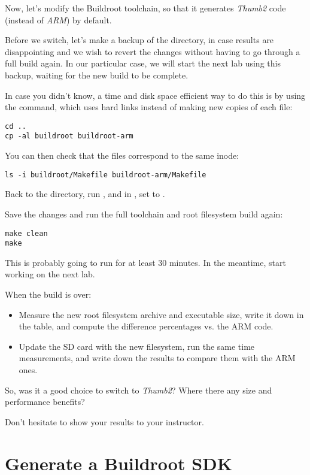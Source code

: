 Now, let's modify the Buildroot toolchain, so that it generates {\em
Thumb2} code (instead of {\em ARM}) by default.

Before we switch, let's make a backup of the  directory,
in case results are disappointing and we wish to revert the changes without
having to go through a full build again. In our particular case, we will
start the next lab using this backup, waiting for the new build to be
complete.

In case you didn't know, a time and disk space efficient way to do this is by using the
 command, which uses hard links instead of making new copies
of each file:

\begin{verbatim}
cd ..
cp -al buildroot buildroot-arm
\end{verbatim}

You can then check that the files correspond to the same inode:
\begin{verbatim}
ls -i buildroot/Makefile buildroot-arm/Makefile
\end{verbatim}

Back to the  directory, run , and
in , set  to
.

Save the changes and run the full toolchain and root filesystem build
again:

\begin{verbatim}
make clean
make
\end{verbatim}

This is probably going to run for at least 30 minutes. In the meantime,
start working on the next lab.

When the build is over:
\begin{itemize}
\item Measure the new root filesystem archive and 
executable size, write it down in the table, and compute the difference
percentages vs. the ARM code.
\item Update the SD card with the new filesystem, run the same time
measurements, and write down the results to compare them with the ARM
ones.
\end{itemize}

So, was it a good choice to switch to {\em Thumb2}? Where there any size
and performance benefits?

Don't hesitate to show your results to your instructor.

\section{Generate a Buildroot SDK}

